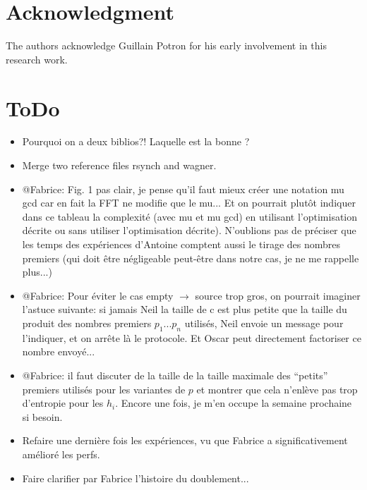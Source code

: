 \documentclass[11pt]{llncs}
\begin{document}
\section{Acknowledgment}

The authors acknowledge Guillain Potron for his early involvement in this research work.\smallskip

\section{ToDo}

\begin{itemize}

\item Pourquoi on a deux biblios?! Laquelle est la bonne ?

\item Merge two reference files rsynch and wagner.\smallskip

\item @Fabrice: Fig. 1 pas clair, je pense qu'il faut mieux créer une notation mu gcd car en fait la FFT ne modifie que le mu... Et on pourrait plut\^ot indiquer dans ce tableau la complexité (avec mu et mu gcd) en utilisant l'optimisation décrite ou sans utiliser l'optimisation décrite). N'oublions pas de préciser que les temps des expériences d'Antoine comptent aussi le tirage des nombres premiers (qui doit \^etre négligeable peut-\^etre dans notre cas, je ne me rappelle plus...)

\item @Fabrice: Pour éviter le cas empty $\rightarrow$ source trop gros, on pourrait imaginer l'astuce suivante: si jamais Neil la taille de c est plus petite que la taille du produit des nombres premiers $p_1$...$p_n$ utilisés, Neil envoie un message pour l'indiquer, et on arr\^ete là le protocole. Et Oscar peut directement factoriser ce nombre envoyé...

\item @Fabrice: il faut discuter de la taille de la taille maximale des ``petits'' premiers utilisés pour les variantes de $p$ et montrer que cela n'enlève pas trop d'entropie pour les $h_i$. Encore une fois, je m'en occupe la semaine prochaine si besoin.

\item Refaire une dernière fois les expériences, vu que Fabrice a significativement amélioré les perfs.

\item Faire clarifier par Fabrice l'histoire du doublement...


\end{itemize}
\end{document}
